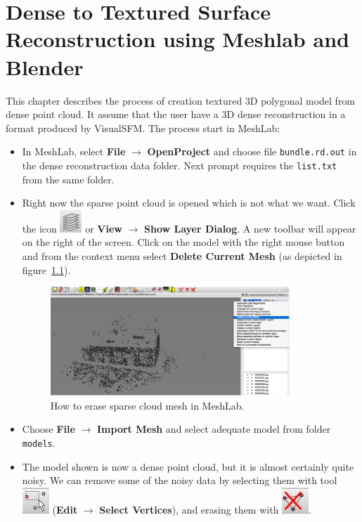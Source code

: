 \chapter{Dense to Textured Surface Reconstruction using Meshlab and Blender}
\label{app:surface-reconstruction}
This chapter describes the process of creation textured 3D polygonal model from dense point cloud. It assume that the user have a 3D dense reconstruction in a format produced by VisualSFM. The process start in MeshLab:
\begin{itemize}
	\item[1.] In MeshLab, select \textbf{File} $\rightarrow$ \textbf{OpenProject} and choose file \texttt{bundle.rd.out} in the dense reconstruction data folder. Next prompt requires the \texttt{list.txt} from the same folder. 
	\item[2.] Right now the sparse point cloud is opened which is not what we want. Click the icon \includegraphics[keepaspectratio,width=.5cm]{fig/meshlab-layers.png} or \textbf{View} $\rightarrow$ \textbf{Show Layer Dialog}. A new toolbar will appear on the right of the screen. Click on the model with the right mouse button and from the context menu select \textbf{Delete Current Mesh} (as depicted in figure~\ref{fig:meshlab-1}).
\begin{figure}[h]
	\begin{center}
		\includegraphics[keepaspectratio,width=9cm]{fig/meshlab-1.pdf}
	\end{center}
	\caption{How to erase sparse cloud mesh in MeshLab.}
	\label{fig:meshlab-1}
\end{figure}
	\item[3.] Choose \textbf{File} $\rightarrow$ \textbf{Import Mesh} and select adequate model from folder \texttt{models}.
	\item[4.] The model shown is now a dense point cloud, but it is almost certainly quite noisy. We can remove some of the noisy data by selecting them with tool \includegraphics[keepaspectratio,width=.5cm]{fig/meshlab-select.png} (\textbf{Edit} $\rightarrow$ \textbf{Select Vertices}), and erasing them with \includegraphics[keepaspectratio,width=.5cm]{fig/meshlab-delete.png}.


\end{itemize}
